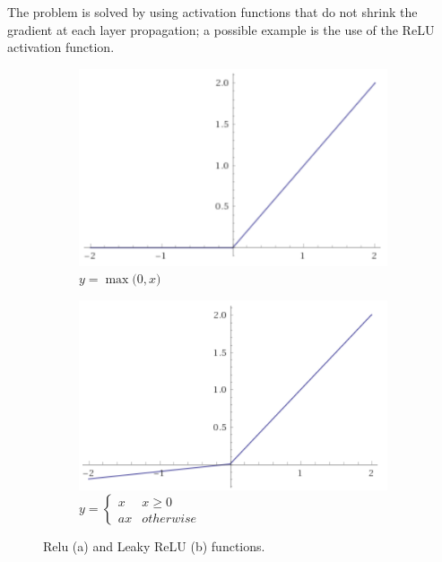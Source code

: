 \documentclass[../main.tex]{subfiles}
\begin{document}
The problem is solved by using activation functions that do not shrink the gradient at each layer propagation; a possible example is the use of the ReLU activation function.

\begin{figure}[h!]
    \centering
    \begin{subfigure}[c]{0.4\textwidth}
        \includegraphics[width=\linewidth]{images/ReLU.png}
        \caption{$ {y = \max{(0,}{ x)}} $}
        \label{fig:ReLy}
    \end{subfigure}
    \hspace{1cm}
    \begin{subfigure}[c]{0.4\textwidth}
        \includegraphics[width=\linewidth]{images/LeakyReLU.png}
        \caption{$ {y = } \left\{
            \begin{array}{ll}
                x & x\geq 0 \\
                ax & otherwise 
            \end{array} \right. $}
        \label{fig:LeakyReLU}
    \end{subfigure}
    \caption{Relu (a) and Leaky ReLU (b) functions.  }
    \label{fig:ReLUs}
\end{figure}
\end{document}
